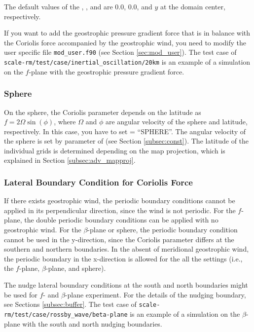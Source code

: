 The default values of the , , 
and  are 0.0, 0.0, and $y$ at the domain center, respectively.

If you want to add the geostrophic pressure gradient force that is in balance with the Coriolis force accompanied by the geostrophic wind, you need to modify the user specific file \verb|mod_user.f90| (see Section \ref{sec:mod_user}).
The test case of \verb|scale-rm/test/case/inertial_oscillation/20km| is an example of a simulation on the $f$-plane with the geostrophic pressure gradient force.


\subsubsection{Sphere}
On the sphere, the Coriolis parameter depends on the latitude as $f = 2\Omega \sin(\phi)$, where $\Omega$ and $\phi$ are angular velocity of the sphere and latitude, respectively.
In this case, you have to set  = ``SPHERE''.
The angular velocity of the sphere is set by  parameter of  (see Section \ref{subsec:const}).
The latitude of the individual grids is determined depending on the map projection, which is explained in Section \ref{subsec:adv_mapproj}.



\subsubsection{Lateral Boundary Condition for Coriolis Force}

If there exists geostrophic wind, the periodic boundary conditions cannot be applied in its perpendicular direction, since the wind is not periodic.
For the $f$-plane, the double periodic boundary conditions can be applied with no geostrophic wind.
For the $\beta$-plane or sphere, the periodic boundary condition cannot be used in the y-direction, since the Coriolis parameter differs at the southern and northern boundaries.
In the absent of meridional geostrophic wind, the periodic boundary in the x-direction is allowed for the all the settings (i.e., the $f$-plane, $\beta$-plane, and sphere).


The nudge lateral boundary conditions at the south and north boundaries might be used for $f$- and $\beta$-plane experiment.
For the details of the nudging boundary, see Sections \ref{subsec:buffer}.
The test case of \verb|scale-rm/test/case/rossby_wave/beta-plane| is an example of a simulation on the $\beta$-plane with the south and north nudging boundaries.




